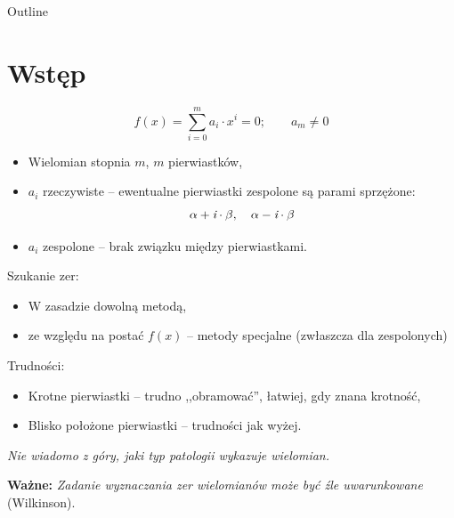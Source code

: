 

\subtitle{8. Arytmetyka komputerowa}


  \maketitle
	\begin{frame}{Outline}
		\tableofcontents
	\end{frame}

  \section{Wstęp}

  \begin{frame}
    $$ f(x) = \sum_{i=0}^m a_i \cdot x^i = 0; \qquad a_m \neq 0 $$

    \begin{itemize}
      \item Wielomian stopnia $m$, $m$ pierwiastków,
      \item $a_i$ rzeczywiste -- ewentualne pierwiastki zespolone są parami sprzężone:
      $$ \alpha + \textit{\textrm{i}} \cdot \beta, \quad \alpha - \textit{\textrm{i}} \cdot \beta $$
      \item $a_i$ zespolone -- brak związku między pierwiastkami.
    \end{itemize}
  \end{frame}

  \begin{frame}
    Szukanie zer:
    \begin{itemize}
      \item W zasadzie dowolną metodą,
      \item ze względu na postać $f(x)$ -- metody specjalne (zwłaszcza dla zespolonych)
    \end{itemize}

    Trudności:
    \begin{itemize}
      \item Krotne pierwiastki -- trudno ,,obramować'', łatwiej, gdy znana krotność,
      \item Blisko położone pierwiastki -- trudności jak wyżej.
    \end{itemize}

    \textit{Nie wiadomo z góry, jaki typ patologii wykazuje wielomian.}

    \vspace{5px}

    \textbf{Ważne:} \textit{Zadanie wyznaczania zer wielomianów może być źle uwarunkowane} (Wilkinson).
  \end{frame}


